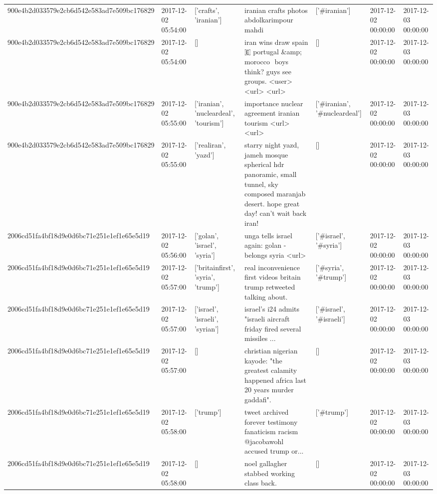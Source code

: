 \begin{tabular}{lllllll}
900e4b2d033579e2cb6d542e583ad7e509bc176829 & 2017-12-02 05:54:00 & ['crafts', 'iranian'] & iranian crafts photos abdolkarimpour mahdi & ['#iranian'] & 2017-12-02 00:00:00 & 2017-12-03 00:00:00 \\
900e4b2d033579e2cb6d542e583ad7e509bc176829 & 2017-12-02 05:54:00 & [] & iran wins draw spain🇪 portugal \&amp; morocco ️️️ boys think? guys see groups. <user> <url> <url> & [] & 2017-12-02 00:00:00 & 2017-12-03 00:00:00 \\
900e4b2d033579e2cb6d542e583ad7e509bc176829 & 2017-12-02 05:55:00 & ['iranian', 'nucleardeal', 'tourism'] & importance nuclear agreement iranian tourism <url> <url> & ['#iranian', '#nucleardeal'] & 2017-12-02 00:00:00 & 2017-12-03 00:00:00 \\
900e4b2d033579e2cb6d542e583ad7e509bc176829 & 2017-12-02 05:55:00 & ['realiran', 'yazd'] & starry night yazd, jameh mosque spherical hdr panoramic, small tunnel, sky composed maranjab desert. hope great day! can't wait back iran! & [] & 2017-12-02 00:00:00 & 2017-12-03 00:00:00 \\
2006cd51fa4bf18d9e0d6bc71e251e1ef1e65e5d19 & 2017-12-02 05:56:00 & ['golan', 'israel', 'syria'] & unga tells israel again: golan - belongs syria <url> & ['#israel', '#syria'] & 2017-12-02 00:00:00 & 2017-12-03 00:00:00 \\
2006cd51fa4bf18d9e0d6bc71e251e1ef1e65e5d19 & 2017-12-02 05:57:00 & ['britainfirst', 'syria', 'trump'] & real inconvenience first videos britain trump retweeted talking about. & ['#syria', '#trump'] & 2017-12-02 00:00:00 & 2017-12-03 00:00:00 \\
2006cd51fa4bf18d9e0d6bc71e251e1ef1e65e5d19 & 2017-12-02 05:57:00 & ['israel', 'israeli', 'syrian'] & israel's i24 admits "israeli aircraft friday fired several missiles ... & ['#israel', '#israeli'] & 2017-12-02 00:00:00 & 2017-12-03 00:00:00 \\
2006cd51fa4bf18d9e0d6bc71e251e1ef1e65e5d19 & 2017-12-02 05:57:00 & [] & christian nigerian kayode: "the greatest calamity happened africa last 20 years murder gaddafi". & [] & 2017-12-02 00:00:00 & 2017-12-03 00:00:00 \\
2006cd51fa4bf18d9e0d6bc71e251e1ef1e65e5d19 & 2017-12-02 05:58:00 & ['trump'] & tweet archived forever testimony fanaticism racism @jacobawohl accused trump or... & ['#trump'] & 2017-12-02 00:00:00 & 2017-12-03 00:00:00 \\
2006cd51fa4bf18d9e0d6bc71e251e1ef1e65e5d19 & 2017-12-02 05:58:00 & [] & noel gallagher stabbed working class back. & [] & 2017-12-02 00:00:00 & 2017-12-03 00:00:00 \\

\end{tabular}
